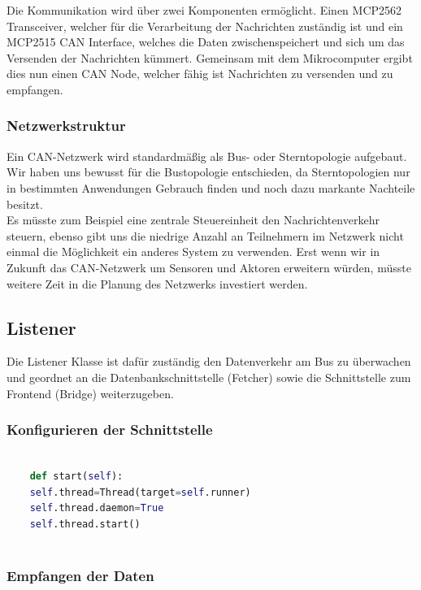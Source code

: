 Die Kommunikation wird über zwei Komponenten ermöglicht. Einen MCP2562 Transceiver, welcher für die Verarbeitung der Nachrichten zuständig ist und ein MCP2515 CAN Interface, welches die Daten zwischenspeichert und sich um das Versenden der Nachrichten kümmert. Gemeinsam mit dem Mikrocomputer ergibt dies nun einen CAN Node, welcher fähig ist Nachrichten zu versenden und zu empfangen.

\subsubsection{Netzwerkstruktur}

Ein CAN-Netzwerk wird standardmäßig als Bus- oder Sterntopologie aufgebaut. Wir haben uns bewusst für die Bustopologie entschieden, da Sterntopologien nur in bestimmten Anwendungen Gebrauch finden und noch dazu markante Nachteile besitzt.\\ Es müsste zum Beispiel eine zentrale Steuereinheit den Nachrichtenverkehr steuern, ebenso gibt uns die niedrige Anzahl an Teilnehmern im Netzwerk nicht einmal die Möglichkeit ein anderes System zu verwenden. Erst wenn wir in Zukunft das CAN-Netzwerk um Sensoren und Aktoren erweitern würden, müsste weitere Zeit in die Planung des Netzwerks investiert werden. 

\newpage

\subsection{Listener}

Die Listener Klasse ist dafür zuständig den Datenverkehr am Bus zu überwachen und geordnet an die Datenbankschnittstelle (Fetcher) sowie die Schnittstelle zum Frontend (Bridge) weiterzugeben.

\subsubsection{Konfigurieren der Schnittstelle}
	
\begin{lstlisting}[language=Python, caption={Konfigurieren des CAN Adapters},captionpos=b]
	
	def start(self):
	self.thread=Thread(target=self.runner)
	self.thread.daemon=True
	self.thread.start()
	
\end{lstlisting}

\subsubsection{Empfangen der Daten}


